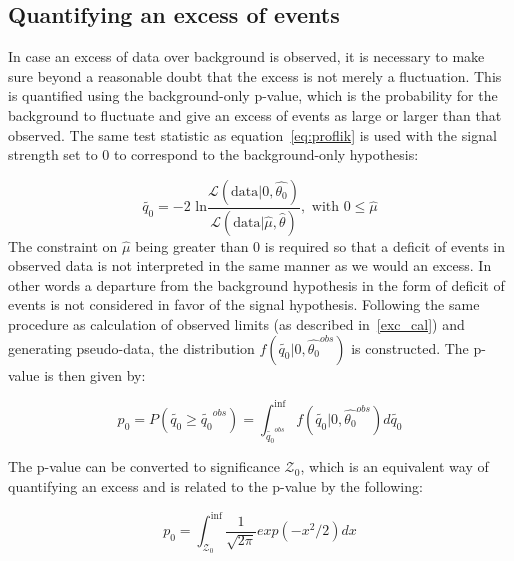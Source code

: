 \subsection{Quantifying an excess of events}
\label{theo_uncert}
In case an excess of data over background is observed, it is necessary to make sure beyond a reasonable doubt that the excess is not merely a fluctuation. This is quantified using the background-only p-value, which is the probability for the background to fluctuate and give an excess of events as large or larger than that observed. The same test statistic as equation~\ref{eq:proflik} is used with the signal strength set to 0 to correspond to the background-only hypothesis:

\begin{equation}
\label{eq:proflik_b}
  \tilde{q_0}=-2\text{ ln}\frac{\mathcal{L}(\text{data}|0,\hat{\theta_0})}{\mathcal{L}(\text{data}|\hat{\mu},\hat{\theta})},\text{   with  } 0\leq\hat{\mu} 
\end{equation}
The constraint on $\hat\mu$ being greater than 0 is required so that a deficit of events in observed data is not interpreted in the same manner as we would an excess. In other words a departure from the background hypothesis in the form of deficit of events is not considered in favor of the signal hypothesis. Following the same procedure as calculation of observed limits (as described in~\ref{exc_cal}) and generating pseudo-data, the distribution $f(\tilde{q_0}|0,\hat{\theta_{0}}^{obs})$ is constructed. The p-value is then given by:

\begin{equation}                                                                                                                          
  \label{eq:p0}                                                     
  p_0=P(\tilde{q_0}\geq \tilde{q_0}^{obs})=\int_{\tilde{q_0}^{obs}}^{\inf}f(\tilde{q_0}|0,\hat{\theta_0}^{obs})d\tilde{q_0}               \end{equation}

The p-value can be converted to significance $\mathcal{Z}_0$, which is an equivalent way of quantifying an excess and is related to the p-value by the following:

\begin{equation}                                                                                                                          
  \label{eq:sig}                                                                                                                           p_0=\int_{\mathcal{Z}_0}^{\inf}\frac{1}{\sqrt{2\pi}}exp(-x^2/2)dx
\end{equation}

